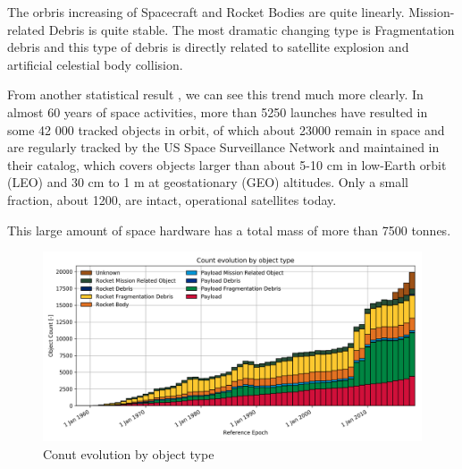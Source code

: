 The orbris increasing of Spacecraft and Rocket Bodies are quite linearly. Mission-related Debris is quite stable. The most dramatic changing type is Fragmentation debris and this type of debris is directly related to satellite explosion and artificial celestial body collision.


From another statistical result , we can see this trend much more clearly. In almost 60 years of space activities, more than 5250 launches have resulted in some 42 000 tracked objects in orbit, of which about 23000 remain in space and are regularly tracked by the US Space Surveillance Network and maintained in their catalog, which covers objects larger than about 5-10 cm in low-Earth orbit (LEO) and 30 cm to 1 m at geostationary (GEO) altitudes. Only a small fraction, about 1200, are intact, operational satellites today.

This large amount of space hardware has a total mass of more than 7500 tonnes.

\begin{figure}[ht]
\centering
\includegraphics[width=\textwidth]{fig/motivation/all_evo_type_count}
\caption{Conut evolution by object type}
\label{moti-all_evo_type_count}
\end{figure}

